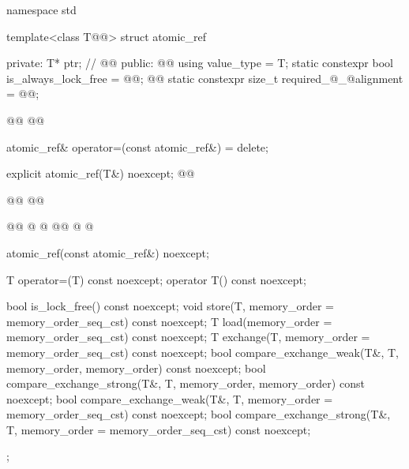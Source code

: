 \begin{codeblock}
namespace std {

  template<class T@@> struct atomic_ref {
  private:
    T* ptr;      // \expos
    @@
  public:
    @@
    using value_type = T;
    static constexpr bool is_always_lock_free = @@;
    @@
    static constexpr size_t required_@_@alignment = @@;

    @@
    @@

    atomic_ref& operator=(const atomic_ref&) = delete;

    explicit atomic_ref(T&) noexcept;
    @@
   
    @@
    @@
    
    @@
    @  @
    @@
    @  @

    atomic_ref(const atomic_ref&) noexcept;

    T operator=(T) const noexcept;
    operator T() const noexcept;

    bool is_lock_free() const noexcept;
    void store(T, memory_order = memory_order_seq_cst) const noexcept;
    T load(memory_order = memory_order_seq_cst) const noexcept;
    T exchange(T, memory_order = memory_order_seq_cst) const noexcept;
    bool compare_exchange_weak(T&, T,
                               memory_order, memory_order) const noexcept;
    bool compare_exchange_strong(T&, T,
                                 memory_order, memory_order) const noexcept;
    bool compare_exchange_weak(T&, T,
                               memory_order = memory_order_seq_cst) const noexcept;
    bool compare_exchange_strong(T&, T,
                                 memory_order = memory_order_seq_cst) const noexcept;
  };
}
\end{codeblock}
~\\

